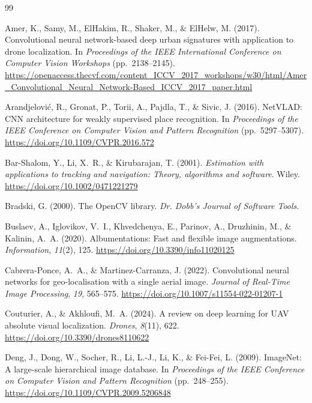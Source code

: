 \documentclass[english, Lau, oneside]{sapthesis}%
\begin{document}
\backmatter
{}
\begin{thebibliography}{99}

Amer, K., Samy, M., ElHakim, R., Shaker, M., \& ElHelw, M. (2017).
Convolutional neural network-based deep urban signatures with application to drone localization.
In \textit{Proceedings of the IEEE International Conference on Computer Vision Workshops} (pp.~2138--2145). \url{https://openaccess.thecvf.com/content_ICCV_2017_workshops/w30/html/Amer_Convolutional_Neural_Network-Based_ICCV_2017_paper.html}

Arandjelovi{\'c}, R., Gronat, P., Torii, A., Pajdla, T., \& Sivic, J. (2016).
NetVLAD: CNN architecture for weakly supervised place recognition.
In \textit{Proceedings of the IEEE Conference on Computer Vision and Pattern Recognition} (pp.~5297--5307). \url{https://doi.org/10.1109/CVPR.2016.572}

Bar-Shalom, Y., Li, X.~R., \& Kirubarajan, T. (2001).
\textit{Estimation with applications to tracking and navigation: Theory, algorithms and software}.
Wiley. \url{https://doi.org/10.1002/0471221279}

Bradski, G. (2000).
The OpenCV library.
\textit{Dr. Dobb's Journal of Software Tools}.

Buslaev, A., Iglovikov, V.~I., Khvedchenya, E., Parinov, A., Druzhinin, M., \& Kalinin, A.~A. (2020).
Albumentations: Fast and flexible image augmentations.
\textit{Information}, \textit{11}(2), 125. \url{https://doi.org/10.3390/info11020125}

Cabrera-Ponce, A.~A., \& Martinez-Carranza, J. (2022).
Convolutional neural networks for geo-localisation with a single aerial image.
\textit{Journal of Real-Time Image Processing}, \textit{19}, 565--575. \url{https://doi.org/10.1007/s11554-022-01207-1}

Couturier, A., \& Akhloufi, M.~A. (2024).
A review on deep learning for UAV absolute visual localization.
\textit{Drones}, \textit{8}(11), 622. \url{https://doi.org/10.3390/drones8110622}

Deng, J., Dong, W., Socher, R., Li, L.-J., Li, K., \& Fei-Fei, L. (2009).
ImageNet: A large-scale hierarchical image database.
In \textit{Proceedings of the IEEE Conference on Computer Vision and Pattern Recognition} (pp.~248--255). \url{https://doi.org/10.1109/CVPR.2009.5206848}


\end{thebibliography}
\end{document}
